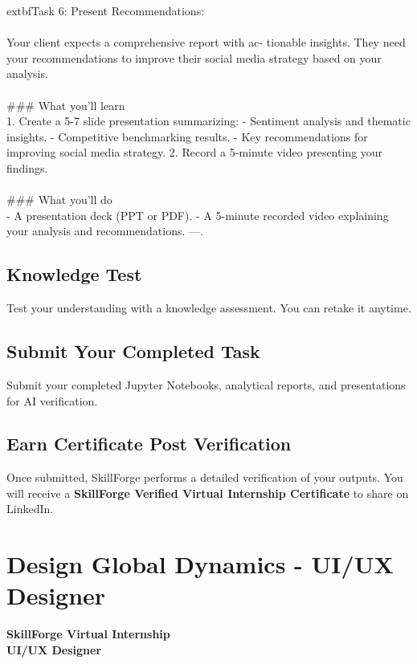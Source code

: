 \documentclass{article}
\begin{document}
	extbf{Task 6:} Present Recommendations:  \\
 \\
 Your client expects a comprehensive report with ac- tionable insights. They need your recommendations to improve their social media strategy based on your analysis. \\
 \\
### What you'll learn \\
1. Create a 5-7 slide presentation summarizing: - Sentiment analysis and thematic insights. - Competitive benchmarking results. - Key recommendations for improving social media strategy. 2. Record a 5-minute video presenting your findings. \\
 \\
### What you'll do \\
- A presentation deck (PPT or PDF). - A 5-minute recorded video explaining your analysis and recommendations. —.

\subsection*{Knowledge Test}
Test your understanding with a knowledge assessment. You can retake it anytime.\\

\subsection*{Submit Your Completed Task}
Submit your completed Jupyter Notebooks, analytical reports, and presentations for AI verification.\\

\subsection*{Earn Certificate Post Verification}
Once submitted, SkillForge performs a detailed verification of your outputs. You will receive a \textbf{SkillForge Verified Virtual Internship Certificate} to share on LinkedIn.\\

\newpage

\section{Design Global Dynamics - UI/UX Designer}

\textbf{SkillForge Virtual Internship} \\
\textbf{UI/UX Designer} \\
\end{document}
